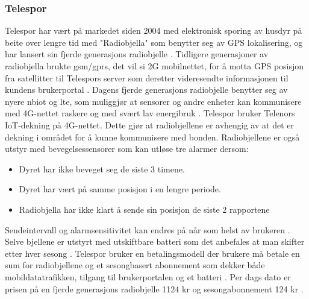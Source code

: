  \subsubsection{Telespor}
 Telespor har vært på markedet siden 2004 med elektronisk sporing av husdyr på beite over lengre tid med "Radiobjella" som benytter seg av GPS lokalisering, og har lansert sin fjerde generasjons radiobjelle \cite[~s.69]{kvamRoleAdvisoryServices2019} \cite{ProduktTelespor}. Tidligere generasjoner av radiobjella brukte \acrshort{gsm}/\acrshort{gprs}, det vil si 2G mobilnettet, for å motta GPS posisjon fra satellitter til Telespors server som deretter videresendte informasjonen til kundens brukerportal  \cite{Telesporsystemet}. Dagens fjerde generasjons radiobjelle benytter seg av nyere \acrfull{nbiot} og \acrshort{lte}, som muliggjør at sensorer og andre enheter kan kommunisere med 4G-nettet raskere og med svært lav energibruk \cite{lorentzenTingenesInternettInntar2018, ProduktTelespor}. Telespor bruker Telenors IoT-dekning på 4G-nettet. Dette gjør at radiobjellene er avhengig av at det er dekning i området for å kunne kommunisere med bonden. Radiobjellene er også utstyr med bevegelsessensorer som kan utløse tre alarmer \cite{ProduktTelespor} dersom: 
 \begin{itemize}
     \item Dyret har ikke beveget seg de siste 3 timene.
     \item Dyret har vært på samme posisjon i en lengre periode.
     \item Radiobjella har ikke klart å sende sin posisjon de siste 2 rapportene
 \end{itemize}
 \noindent
Sendeintervall og alarmsensitivitet kan endres på når som helst av brukeren \cite{ProduktTelespor}. Selve bjellene er utstyrt med utskiftbare batteri som det anbefales at man skifter etter hver sesong \cite{ProduktTelespor}. Telespor bruker en betalingsmodell der brukere må betale en sum for radiobjellene og et sesongbasert abonnement som dekker både mobildatatrafikken, tilgang til brukerportalen og et batteri \cite{telenorDekningIoTPa, TelesporNettbutikka}. Per dags dato er prisen på en fjerde generasjons radiobjelle 1124 kr og sesongabonnement 124 kr \cite{TelesporNettbutikka}.

